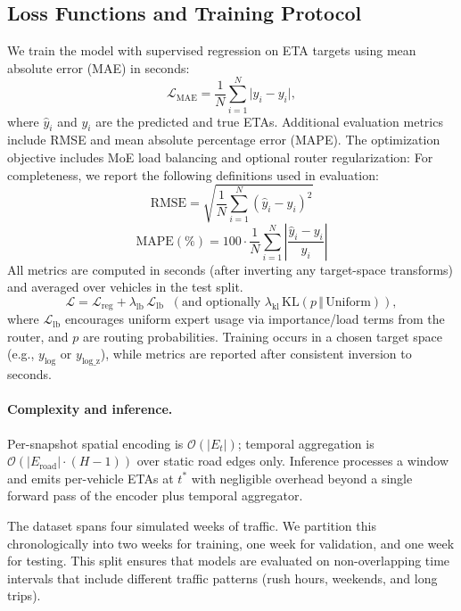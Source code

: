 \subsection{Loss Functions and Training Protocol}\label{sec:loss}
We train the model with supervised regression on ETA targets using mean absolute error (MAE) in seconds:
\begin{equation}
\mathcal{L}_{\text{MAE}} = \frac{1}{N}\sum_{i=1}^N \big| \hat{y}_i - y_i \big|,
\end{equation}
where $\hat{y}_i$ and $y_i$ are the predicted and true ETAs. Additional evaluation metrics include RMSE and mean absolute percentage error (MAPE). The optimization objective includes MoE load balancing and optional router regularization:
For completeness, we report the following definitions used in evaluation:
\begin{equation}
\mathrm{RMSE} = \sqrt{\frac{1}{N}\sum_{i=1}^{N} (\hat{y}_i - y_i)^2}
\end{equation}
\begin{equation}
\mathrm{MAPE}(\%) = 100\cdot \frac{1}{N}\sum_{i=1}^{N} \left|\frac{\hat{y}_i - y_i}{y_i}\right|
\end{equation}
All metrics are computed in seconds (after inverting any target-space transforms) and averaged over vehicles in the test split.
\begin{equation}
\mathcal{L} = \mathcal{L}_{\text{reg}} + \lambda_{\text{lb}}\,\mathcal{L}_{\text{lb}} \;\; (\text{and optionally } 
\lambda_{\text{kl}}\,\mathrm{KL}(p\,\Vert\,\text{Uniform})),
\end{equation}
where $\mathcal{L}_{\text{lb}}$ encourages uniform expert usage via importance/load terms from the router, and $p$ are routing probabilities. Training occurs in a chosen target space (e.g., $y_{\text{log}}$ or $y_{\text{log\_z}}$), while metrics are reported after consistent inversion to seconds.

\paragraph{Complexity and inference.}
Per-snapshot spatial encoding is $\mathcal{O}(|E_t|)$; temporal aggregation is $\mathcal{O}(|E_\text{road}|\cdot(H{-}1))$ over static road edges only. Inference processes a window and emits per-vehicle ETAs at $t^*$ with negligible overhead beyond a single forward pass of the encoder plus temporal aggregator.

The dataset spans four simulated weeks of traffic. We partition this chronologically into two weeks for training, one week for validation, and one week for testing. This split ensures that models are evaluated on non-overlapping time intervals that include different traffic patterns (rush hours, weekends, and long trips).


